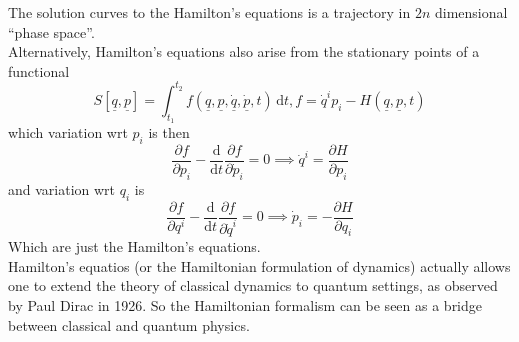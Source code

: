 The solution curves to the Hamilton's equations is a trajectory in $2n$ dimensional ``phase space''.\\
Alternatively, Hamilton's equations also arise from the stationary points of a functional
$$S[\underline{q},\underline{p}]=\int_{t_1}^{t_2}f(\underline{q},\underline{p},\underline{\dot{q}},\underline{\dot{p}},t)\,\mathrm dt,f=\dot{q}^ip_i-H(\underline{q},\underline{p},t)$$
which variation wrt $p_i$ is then
$$\frac{\partial f}{\partial p_i}-\frac{\mathrm d}{\mathrm dt}\frac{\partial f}{\partial \dot{p}_i}=0\implies \dot{q}^i=\frac{\partial H}{\partial p_i}$$
and variation wrt $q_i$ is
$$\frac{\partial f}{\partial q^i}-\frac{\mathrm d}{\mathrm dt}\frac{\partial f}{\partial \dot{q}^i}=0\implies \dot{p}_i=-\frac{\partial H}{\partial q_i}$$
Which are just the Hamilton's equations.\\
Hamilton's equatios (or the Hamiltonian formulation of dynamics) actually allows one to extend the theory of classical dynamics to quantum settings, as observed by Paul Dirac in 1926.
So the Hamiltonian formalism can be seen as a bridge between classical and quantum physics.